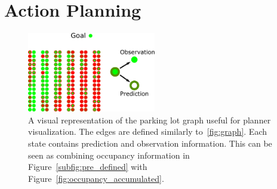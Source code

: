 

\section{Action Planning}
\label{sec:planning_results}

\begin{figure}[t]
\begin{center}
\includegraphics[width=0.5\textwidth]{pictures/graph_observations.pdf}
\end{center}
\caption{A visual representation of the parking lot graph useful for planner visualization. The edges are defined similarly to~\ref{fig:graph}. Each state contains prediction and observation information. This can be seen as combining occupancy information in Figure~\ref{subfig:pre_defined} with Figure~\ref{fig:occupancy_accumulated}.}
\label{fig:graph_accumulated_illustration}
\end{figure}


